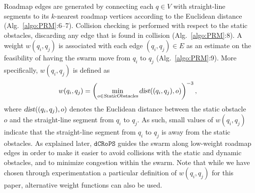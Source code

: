 \documentclass[letterpaper, 10pt, conference]{ieeeconf}
\newcommand{\Acronym}[1]{\ensuremath{{{\texttt{#1}}}}}
\newcommand{\Var}[1]{\ensuremath{{{\textsl{#1}}}}}
\newcommand{\Name}{\Acronym{dCRoPS}}
\begin{document}
Roadmap edges are generated by connecting each $q \in V$ with
straight-line segments to its $k$-nearest roadmap vertices according
to the Euclidean distance (Alg.~\ref{algo:PRM}:6--7). Collision
checking is performed with respect to the static obstacles, discarding
any edge that is found in collision (Alg.~\ref{algo:PRM}:8). A weight
$w(q_i, q_j)$ is associated with each edge $(q_i, q_j) \in E$ as an
estimate on the feasibility of having the swarm move from $q_i$ to
$q_j$ (Alg.~\ref{algo:PRM}:9). More specifically, $w(q_i, q_j)$ is defined as
$$
w(q_i, q_j) = \left(\min_{o \in \Var{StaticObstacles}} \Var{dist}((q_i,
q_j), o)\right)^{-3},
$$ where $\Var{dist}((q_i, q_j), o)$ denotes the Euclidean distance
between the static obstacle $o$ and the straight-line segment from
$q_i$ to $q_j$.  As such, small values of $w(q_i, q_j)$ indicate that
the straight-line segment from $q_i$ to $q_j$ is away from the static
obstacles. As explained later, $\Name$ guides the swarm along
low-weight roadmap edges in order to make it easier to avoid collisions with
the static and dynamic obstacles, and to minimize congestion within
the swarm.  Note that while we have chosen through experimentation a
particular definition of $w(q_i, q_j)$ for this paper, alternative weight
functions can also be used.
\end{document}
